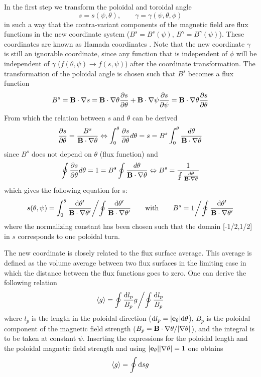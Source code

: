 \documentclass{report}
\def\be{\begin{equation}}
\def\ee{\end{equation}}
\begin{document}
In the first step we transform the poloidal and toroidal angle 
\be 
s = s(\psi,\theta), \qquad \gamma = \gamma(\psi,\theta,\phi)
\ee 
in such a way that the contra-variant components of the magnetic field are flux functions 
in the new coordinate system ($B^s = B^s(\psi)$, $B^\gamma = B^\gamma(\psi)$). These 
coordinates are known as Hamada coordinates \cite{HAM62}. 
Note that the new coordinate $\gamma$ is still an ignorable coordinate, since any function that is independent of $\phi$
will be independent of $\gamma$ ($f(\theta,\psi) \rightarrow f(s,\psi)$) after the coordinate 
transformation. The transformation of the poloidal angle is chosen such that $B^s$ becomes 
a flux function 
\be 
B^s = {\bf B} \cdot \nabla s = {\bf B}\cdot \nabla \theta {\partial s \over \partial \theta} 
+ {\bf B} \cdot \nabla \psi {\partial s \over \partial \psi} = {\bf B} \cdot \nabla \theta 
{\partial s \over \partial \theta}
\ee 
From which the relation between $s$ and $\theta$ can be derived 
\be
{\partial s \over \partial \theta}={B^{s} \over {\bf B \cdot \nabla \theta}}\Leftrightarrow
\int_{0}^{\theta}{\partial s \over \partial \theta}d\theta =s=B^{s}\int_{0}^{\theta}{d\theta \over 
{\bf B}\cdot \nabla \theta}
\ee
since $B^{s}$ does not depend on $\theta$ (flux function) and
\be
\oint {\partial s \over \partial \theta}d\theta =1=B^{s}\oint {d\theta \over {\bf B}\cdot \nabla 
\theta}\Leftrightarrow B^{s}={1 \over \oint {d\theta \over {\bf B}\cdot \nabla \theta} }
\ee
which gives the following equation for s:
\be 
s(\theta,\psi) = {\int_0^\theta {{\rm d} \theta^\prime \over {\bf B} \cdot \nabla \theta^\prime} 
\biggl /  \oint {{\rm d}\theta^\prime \over {\bf B}\cdot \nabla \theta^\prime}} \qquad 
{\rm with} \qquad 
B^s =  {1
\biggl /  \oint {{\rm d}\theta^\prime \over {\bf B}\cdot \nabla \theta^\prime}}
\ee  
where the normalizing constant has been chosen such that the domain [-1/2,1/2] in $s$ corresponds 
to one poloidal turn. 

The new coordinate is closely related to the flux surface average. This average is defined 
as the volume average between two flux surfaces in the limiting case in which the distance between 
the flux functions goes to zero. One can derive the following relation  
\be 
\langle g \rangle = \oint {{\rm d} l_p \over B_p } g \biggl / \oint {{\rm d} l_p \over B_p }
\ee
where $l_p$ is the length in the poloidal direction (${\rm d}l_p = \vert {\bf e}_\theta \vert 
{\rm d} \theta$), $B_p$ is the poloidal component of the magnetic field strength ($B_p = 
{\bf B}\cdot \nabla \theta / \vert \nabla \theta \vert$), and the integral is to be taken at 
constant $\psi$. Inserting the expressions for the 
poloidal length and the poloidal magnetic field strength and using $\vert {\bf e}_\theta\vert 
\vert \nabla \theta \vert = 1$ one obtains 
\be 
\langle g \rangle = \oint {\rm d}s g 
\ee 
\end{document}
